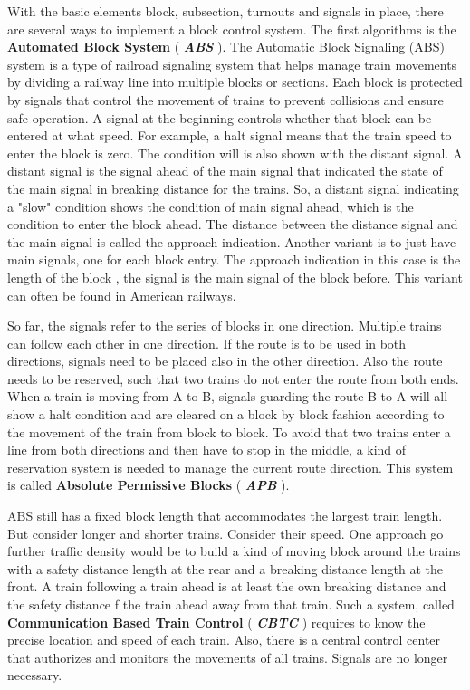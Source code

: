 With the basic elements  block, subsection, turnouts and signals in place, there are several ways to implement a block control system. The first algorithms is the \textbf{Automated Block System} ( \textbf{\textit{ABS}} ). The Automatic Block Signaling (ABS) system is a type of railroad signaling system that helps manage train movements by dividing a railway line into multiple blocks or sections. Each block is protected by signals that control the movement of trains to prevent collisions and ensure safe operation. A signal at the beginning controls whether that block can be entered at what speed. For example, a halt signal means that the train speed to enter the block is zero. The condition will is also shown with the distant signal. A distant signal is the signal ahead of the main signal that indicated the state of the main signal in breaking distance for the trains. So, a distant signal indicating a "slow" condition shows the condition of main signal ahead, which is the condition to enter the block ahead. The distance between the distance signal and the main signal is called the approach indication. Another variant is to just have main signals, one for each block entry. The approach indication in this case is the length of the block , the signal is the main signal of the block before. This variant can often be found in American railways.


So far, the signals refer to the series of blocks in one direction. Multiple trains can follow each other in one direction. If the route is to be used in both directions, signals need to be placed also in the other direction. Also the route needs to be reserved, such that two trains do not enter the route from both ends. When a train is moving from A to B, signals guarding the route B to A will all show a halt condition and are cleared on a block by block fashion according to the movement of the train from block to block. To avoid that two trains enter a line from both directions and then have to stop in the middle, a kind of reservation system is needed to manage the current route direction. This system is called \textbf{Absolute Permissive Blocks} ( \textbf{\textit{APB}} ).

ABS still has a fixed block length that accommodates the largest train length. But consider longer and shorter trains. Consider their speed. One approach go further traffic density would be to build a kind of moving block around the trains with a safety distance length at the rear and a breaking distance length at the front. A train following a train ahead is at least the own breaking distance and the safety distance f the train ahead away from that train. Such a system, called \textbf{Communication Based Train Control} ( \textbf{\textit{CBTC}} ) requires to know the precise location and speed of each train. Also, there is a central control center that authorizes and monitors the movements of all trains. Signals are no longer necessary.


